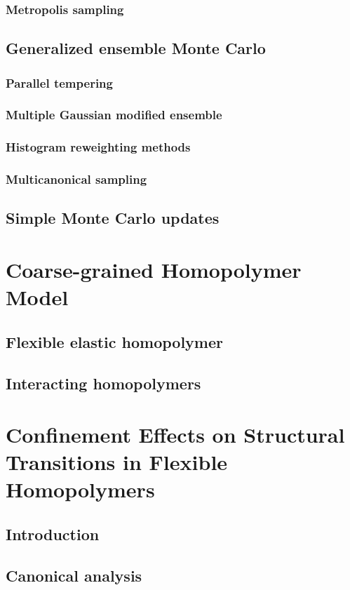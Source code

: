\documentclass[12pt]{report}
\begin{document}
\subsection{Metropolis sampling}
\section{Generalized ensemble Monte Carlo}
\subsection{Parallel tempering}
\subsection{Multiple Gaussian modified ensemble}
\subsection{Histogram reweighting methods}
\subsection{Multicanonical sampling}
\section{Simple Monte Carlo updates}

\chapter{Coarse-grained Homopolymer Model}
\section{Flexible elastic homopolymer}
\section{Interacting homopolymers}

\chapter{Confinement Effects on Structural Transitions in Flexible Homopolymers}
\section{Introduction}
\section{Canonical analysis}
\end{document}

